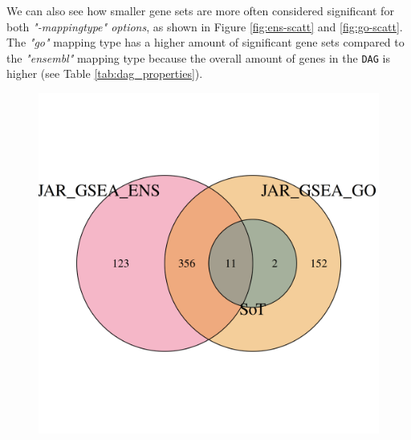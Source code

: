 \documentclass[12pt]{article}
\begin{document}
We can also see how smaller gene sets are more often considered significant
for both \textit{"-mappingtype" options}, as shown in Figure \ref{fig:ens-scatt} and \ref{fig:go-scatt}.
The \textit{"go"} mapping type has a higher amount of significant gene sets compared to the \textit{"ensembl"} mapping type
because the overall amount of genes in the \texttt{DAG} is higher (see Table \ref{tab:dag_properties}).

\begin{figure}[htpb]
    \centering
    \begin{minipage}{0.49\textwidth}
        \centering
        \includegraphics[width=\textwidth]{./plots/gseaOverlap.png}
        \label{fig:gsea-overlap}
    \end{minipage}
    \hfill
    \begin{minipage}{0.49\textwidth}
        \centering

\end{minipage}
\end{figure}
\end{document}

